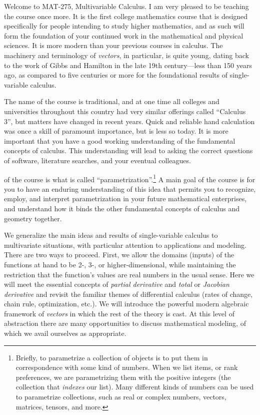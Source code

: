 \documentclass[symmetric]{tufte-handout}
\begin{document}
    Welcome to MAT-275, Multivariable Calculus. I am very pleased to be
    teaching the course once more. It is the first college mathematics course
    that is designed specifically for people intending to study higher mathematics, 
    and as such
    will form the foundation of your continued work in the mathematical and
    physical sciences. It is more modern than your previous courses in
    calculus. The machinery and terminology of \emph{vectors}, in particular,
    is quite young, dating back to the work of Gibbs and Hamilton in the late
    19th century---less than 150 years ago, as compared to five centuries or
    more for the foundational results of single-variable
    calculus.

    The name of the course is traditional, and at one time all colleges and
    universities throughout this country had very similar offerings called
    ``Calculus 3'', but matters have changed in recent years. Quick and reliable
    hand calculation was once a skill of paramount importance, but is less so
    today. It is more important that you have a good working understanding of the
    fundamental concepts of calculus. This understanding will lead to asking the
    correct questions of software, literature searches, and your eventual
    colleagues.

     of the course is what is called
    ``parametrization''.\footnote{Briefly, to parametrize a collection of
    objects is to put them in correspondence with some kind of numbers. When
    we list items, or rank preferences, we are parametrizing them with the
    positive integers (the collection that \emph{indexes} our list). Many
    different kinds of numbers can be used to parametrize collections, such as real
    or complex numbers, vectors, matrices, tensors, and more.} A main goal of
    the course is for you to have an enduring understanding of this idea that
    permits you to recognize, employ, and interpret parametrization in your
    future mathematical enterprises, and understand how it binds the other
    fundamental concepts of calculus and geometry together. 

    We generalize the main ideas and results of single-variable calculus to
    multivariate situations, with particular attention to applications and
    modeling. There are two ways to proceed. First, we allow the domains (inputs)
    of the functions at hand to be 2-, 3-, or higher-dimensional, while
    maintaining the restriction that the function's values are real numbers in the
    usual sense. Here we will meet the essential concepts of \emph{partial
    derivative} and \emph{total} or \emph{Jacobian derivative} and revisit the
    familiar themes of differential calculus (rates of change, chain rule, optimization, etc.).
    We will introduce the powerful modern algebraic framework of \emph{vectors} in
    which the rest of the theory is cast. At this level of abstraction there are
    many opportunities to discuss mathematical modeling, of which we avail
    ourselves as appropriate.
\end{document}
